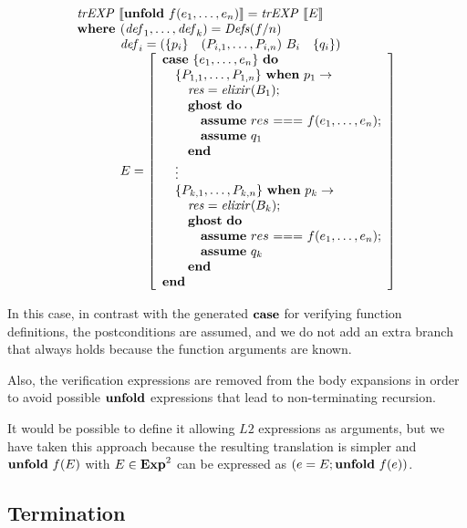 \[
\begin{array}{l}
\trEXP{\unfoldE~f(e_1,\dots,e_n)} = \trEXP{E}\\
\textbf{where } (\mathit{def}_1, \dots, \mathit{def}_k) = \Defs{f/n}\\
\phantom{\textbf{where }} \mathit{def}_i = \left(\{ p_i \}  \quad (P_{i,1}, \dots, P_{i,n})~B_i \quad \{ q_i \} \right) \\
\phantom{\textbf{where }} E = \left[\begin{array}{l}
\caseE~\{e_1,\dots,e_n\}~\doW \\
\quad \{P_{1,1},\dots,P_{1,n}\}~\whenE~p_1 \rightarrow\\ 
\quad\quad \mathit{res} = \mathit{elixir}(B_1); \\
\quad\quad \ghostE~\doW\\ 
\quad\quad\quad\assumeE~res~\mathit{===}~f(e_1,\dots,e_n);\\
\quad\quad\quad\assumeE~q_1\\
\quad\quad \Wend\\
\quad\vdots\\
\quad \{P_{k,1},\dots,P_{k,n}\}~\whenE~p_k \rightarrow\\ 
\quad\quad \mathit{res} = \mathit{elixir}(B_k); \\
\quad\quad \ghostE~\doW\\ 
\quad\quad\quad\assumeE~res~\mathit{===}~f(e_1,\dots,e_n);\\
\quad\quad\quad\assumeE~q_k\\
\quad\quad \Wend\\
\Wend
\end{array}
\right]
\end{array}
\]

In this case, in contrast with the generated $\textbf{case}$ for verifying function
definitions, the postconditions are assumed, and we do not add an extra branch
that always holds because the function arguments are known.

Also, the verification expressions are removed from the body expansions in order
to avoid possible $\textbf{unfold}$ expressions that lead to non-terminating recursion.

It would be possible to define it allowing $L2$ expressions as arguments, but we
have taken this approach because the resulting translation is simpler and
$\textbf{unfold}~f(E)$ with $E \in \mathbf{Exp}^{2}$ can be expressed as $(e =
E;\textbf{unfold}~f(e))$.

\subsection{Termination}

